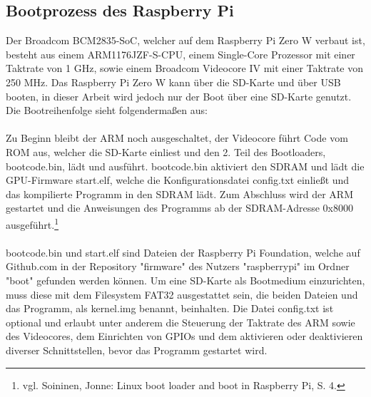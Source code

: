 \documentclass[12pt]{article}
\begin{document}
\subsection{Bootprozess des Raspberry Pi}
Der Broadcom BCM2835-SoC, welcher auf dem Raspberry Pi Zero W verbaut ist, besteht aus einem ARM1176JZF-S-CPU, einem Single-Core Prozessor mit einer Taktrate von 1 GHz, sowie einem Broadcom Videocore IV mit einer Taktrate von 250 MHz. Das Raspberry Pi Zero W kann über die SD-Karte und über USB booten, in dieser Arbeit wird jedoch nur der Boot über eine SD-Karte genutzt. Die Bootreihenfolge sieht folgendermaßen aus:
\\\\Zu Beginn bleibt der ARM noch ausgeschaltet, der Videocore führt Code vom ROM aus, welcher die SD-Karte einliest und den 2. Teil des Bootloaders, bootcode.bin, lädt und ausführt. bootcode.bin aktiviert den SDRAM und lädt die GPU-Firmware start.elf, welche die Konfigurationsdatei config.txt einließt und das kompilierte Programm in den SDRAM lädt. Zum Abschluss wird der ARM gestartet und die Anweisungen des Programms ab der SDRAM-Adresse 0x8000 ausgeführt.\footnote{\selectfont vgl. Soininen, Jonne: Linux boot loader and boot in Raspberry Pi, S. 4.}
\\\\bootcode.bin und start.elf sind Dateien der Raspberry Pi Foundation, welche auf Github.com in der Repository "firmware" des Nutzers "raspberrypi" im Ordner "boot" gefunden werden können. Um eine SD-Karte als Bootmedium einzurichten, muss diese mit dem Filesystem FAT32 ausgestattet sein, die beiden Dateien und das Programm, als kernel.img benannt, beinhalten. Die Datei config.txt ist optional und erlaubt unter anderem die Steuerung der Taktrate des ARM sowie des Videocores, dem Einrichten von GPIOs und dem aktivieren oder deaktivieren diverser Schnittstellen, bevor das Programm gestartet wird.
\end{document}
